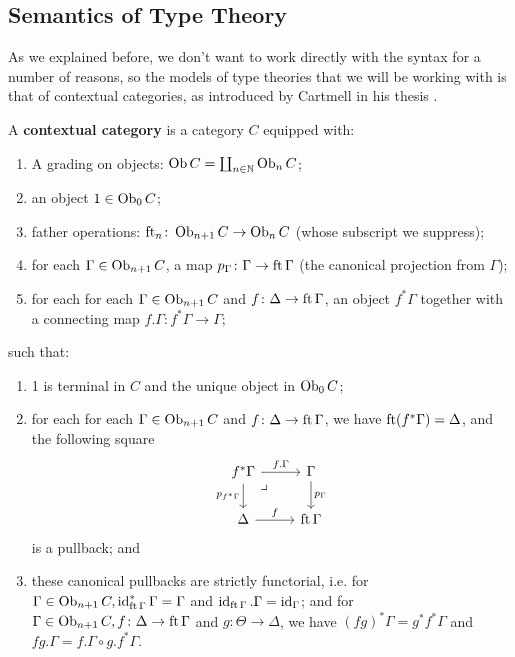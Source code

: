 \documentclass{amsart}
\begin{document}
\subsection{Semantics of Type Theory}
As we explained before, we don't want to work directly with the syntax for a number of reasons, so the models of type theories that we will be working with is that of contextual categories, as introduced by Cartmell in his thesis \cite{Cartmell}.
\begin{defn}
    A \textbf{contextual category} is a category $C$ equipped with:
    \begin{enumerate}
        \item A grading on objects: $\operatorname{Ob} C=\coprod_{n\in\mathbb{N}}\operatorname{Ob}_nC$;
        \item an object $1\in\operatorname{Ob}_0C$;
        \item father operations: $\operatorname{ft}_n\colon\operatorname{Ob}_{n+1}C\to\operatorname{Ob}_nC$ (whose subscript we suppress);
        \item for each $\Gamma\in\operatorname{Ob}_{n+1}C$, a map $p_\Gamma\colon\Gamma\to\operatorname{ft}\Gamma$ (the canonical projection from $\Gamma$);
        \item for each for each $\Gamma\in\operatorname{Ob}_{n+1}C$ and $f\colon\Delta\to\operatorname{ft}\Gamma$, an object $f^*\Gamma$ together with a connecting map $f.\Gamma\colon f^*\Gamma\to\Gamma$;
    \end{enumerate}
    such that:
    \begin{enumerate}
        \item 1 is terminal in $C$ and the unique object in $\operatorname{Ob}_0C$;
        \item for each for each $\Gamma\in\operatorname{Ob}_{n+1}C$ and $f\colon\Delta\to\operatorname{ft}\Gamma$, we have $\operatorname{ft}(f^*\Gamma)=\Delta$, and the following square
        \[\begin{tikzcd}
        f^*\Gamma \arrow[r, "f.\Gamma"] \arrow[d, "p_{f^*\Gamma}"'] \arrow[dr, phantom, "\lrcorner", very near start] & \Gamma \arrow[d, "p_\Gamma"] \\
        \Delta \arrow[r, "f"] & \ft\Gamma
        \end{tikzcd}\]
        is a pullback; and
        \item these canonical pullbacks are strictly functorial, i.e. for $\Gamma\in\operatorname{Ob}_{n+1}C,\operatorname{id}_{\operatorname{ft}\Gamma}^*\Gamma=\Gamma$ and $\operatorname{id}_{\operatorname{ft}\Gamma}.\Gamma=\operatorname{id}_\Gamma$; and for $\Gamma\in\operatorname{Ob}_{n+1}C,f\colon\Delta\to\operatorname{ft}\Gamma$ and $g\colon\Theta\to\Delta$, we have $(fg)^*\Gamma=g^*f^*\Gamma$ and $fg.\Gamma=f.\Gamma\circ g.f^*\Gamma$.
    \end{enumerate}
\end{defn}
\end{document}
